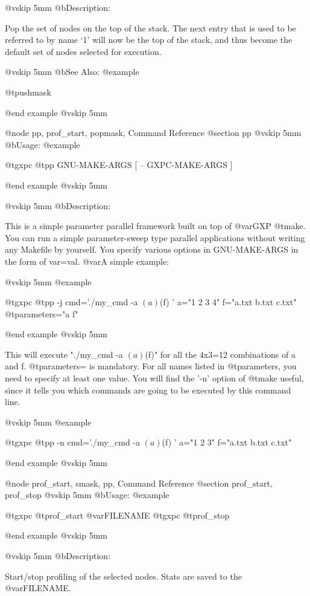 @vskip 5mm
@b{Description:}


  Pop the set of nodes on the top of the stack. The next entry
that is used to be referred to by name `1' will now be the top
of the stack, and thus become the default set of nodes selected
for execution.

@vskip 5mm
@b{See Also:}
@example

  @t{pushmask}

@end example
@vskip 5mm

@node pp, prof_start, popmask, Command Reference
@section pp
@vskip 5mm
@b{Usage:}
@example

  @t{gxpc} @t{pp} GNU-MAKE-ARGS [ -- GXPC-MAKE-ARGS ]

@end example
@vskip 5mm

@vskip 5mm
@b{Description:}


  This is a simple parameter parallel framework built on top of @var{GXP} @t{make}.
You can run a simple parameter-sweep type parallel applications without 
writing any Makefile by yourself.  You specify various options in GNU-MAKE-ARGS 
in the form of var=val.  @var{A} simple example:

@vskip 5mm
@example

  @t{gxpc} @t{pp} -j cmd='./my_cmd -a $(a) $(f) ' a="1 2 3 4" f="a.txt b.txt c.txt" @t{parameters}="a f"

@end example
@vskip 5mm

This will execute "./my_cmd -a $(a) $(f)" for all the 4x3=12 combinations
of a and f. @t{parameters}= is mandatory.  For all names listed in @t{parameters},
you need to specify at least one value.  You will find the '-n' option of 
@t{make} useful, since it tells you which commands are going to be executed by 
this command line.

@vskip 5mm
@example

  @t{gxpc} @t{pp} -n cmd='./my_cmd -a $(a) $(f) ' a="1 2 3" f="a.txt b.txt c.txt"

@end example
@vskip 5mm


@node prof_start, smask, pp, Command Reference
@section prof_start, prof_stop
@vskip 5mm
@b{Usage:}
@example

  @t{gxpc} @t{prof_start} @var{FILENAME}
  @t{gxpc} @t{prof_stop}

@end example
@vskip 5mm

@vskip 5mm
@b{Description:}


  Start/stop profiling of the selected nodes. Stats are saved to
the @var{FILENAME}.

